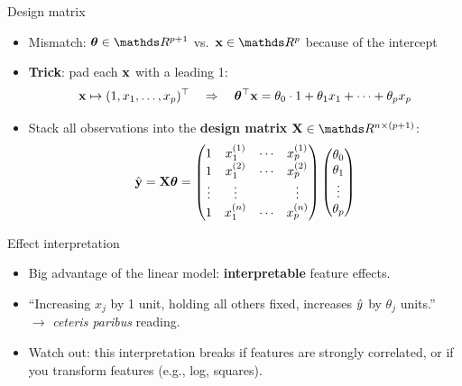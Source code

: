 \documentclass[aspectratio=169]{beamer}
\begin{document}
\begin{frame}{Design matrix}
  \begin{itemize}
    \item Mismatch: $\thetav \in \R^{p+1}$ vs.\ $\xv \in \R^p$ because of the intercept
    \item \textbf{Trick}: pad each $\mathbf{x}$ with a leading 1:
      \[
        \mathbf{x} \mapsto (1, x_1, \dots, x_p)^\top
        \quad\Rightarrow\quad
        \bm{\theta}^\top \mathbf{x} = \theta_0 \cdot 1 + \theta_1 x_1 + \dots + \theta_p x_p
      \]
    \item Stack all observations into the \textbf{design matrix} $\Xmat \in \R^{n \times (p+1)}$:
      \[
        \hat{\mathbf{y}} = \mathbf{X} \bm{\theta}
        = \begin{pmatrix}
          1 & x_1^{(1)} & \cdots & x_p^{(1)} \\
          1 & x_1^{(2)} & \cdots & x_p^{(2)} \\
          \vdots & \vdots & & \vdots \\
          1 & x_1^{(n)} & \cdots & x_p^{(n)}
        \end{pmatrix}
        \begin{pmatrix} \theta_0 \\ \theta_1 \\ \vdots \\ \theta_p \end{pmatrix}
      \]
  \end{itemize}
\end{frame}

\begin{frame}{Effect interpretation}
  \begin{itemize}
    \item Big advantage of the linear model: \textbf{interpretable} feature effects.
    \item ``Increasing $x_j$ by 1 unit, holding all others fixed, increases $\hat{y}$ by $\theta_j$ units.''\\
      $\rightarrow$ \emph{ceteris paribus} reading.
    \item Watch out: this interpretation breaks if features are strongly correlated, or if you transform features (e.g., log, squares).
  \end{itemize}
\end{frame}
\end{document}
